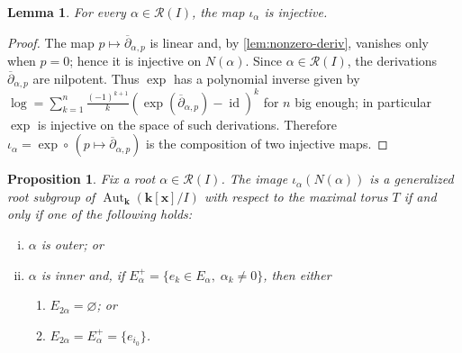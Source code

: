 \documentclass[11pt,letterpaper,reqno]{amsart}
\newtheorem{lemma}[lemma]{Lemma}
\newtheorem{proposition}[proposition]{Proposition}
\theoremstyle{remark}
\theoremstyle{definition}
\def\XX{\mathbf{x}}
\newcommand{\KK}[0]{\ensuremath{\mathbf{k}}}
\newcommand{\Aut}[0]{\ensuremath{\operatorname{Aut}}}
\begin{document}
\begin{lemma}\label{lem:iota-injective}
For every $\alpha \in \mathcal{R}(I)$, the map $\iota_\alpha$ is injective.
\end{lemma}

\begin{proof}
The map $p\mapsto\overline\partial_{\alpha,p}$ is linear and, by {\cref{lem:nonzero-deriv}}, vanishes only when $p=0$; hence it is injective on $N(\alpha)$.
Since $\alpha\in\mathcal R(I)$, the derivations $\overline\partial_{\alpha,p}$
are nilpotent. Thus $\exp$ has a polynomial inverse
given by $\log = \sum_{k=1}^{n} \frac{(-1)^{k+1}}{k}
(\exp(\overline\partial_{\alpha,p})-\operatorname{id})^k$ for $n$ big enough; in particular $\exp$
is injective on the space of such derivations. Therefore
$\iota_\alpha = \exp\circ\,(p\mapsto\overline\partial_{\alpha,p})$ is the
composition of two injective maps.
\end{proof}

\begin{proposition}\label{prop:gen-root}
Fix a root $\alpha\in\mathcal R(I)$. The image $\iota_\alpha(N(\alpha))$ is a generalized root subgroup of $\Aut_\KK(\KK[\XX]/I)$ with respect to the maximal torus $T$ if and only if one of the following holds:
\begin{enumerate}[(i)]
\item $\alpha$ is outer; or
\item $\alpha$ is inner and, if $E^+_\alpha=\{e_k\in E_\alpha,\;\alpha_k\neq0\}$, then either
\begin{enumerate}
  \item[(ii.1)] $E_{2\alpha}=\varnothing$; or
  \item[(ii.2)] $E_{2\alpha}=E^+_\alpha=\{e_{i_0}\}$.
\end{enumerate}
\end{enumerate}
\end{proposition}
\end{document}
